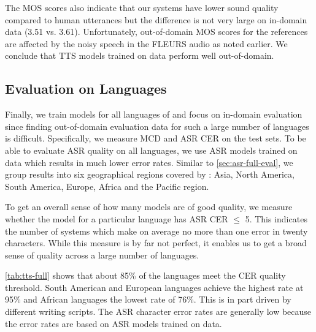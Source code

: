 The MOS scores also indicate that our systems have lower sound quality compared to human utterances but the difference is not very large on in-domain data (3.51 vs. 3.61).
Unfortunately, out-of-domain MOS scores for the references are affected by the noisy speech in the FLEURS audio as noted earlier.
We conclude that TTS models trained on \MMS{} data perform well out-of-domain.


\subsection{Evaluation on \nummmslang{} Languages}
\label{sec:tts-results-all}

Finally, we train models for all languages of \MMS{} and focus on in-domain evaluation since finding out-of-domain evaluation data for such a large number of languages is difficult.
Specifically, we measure MCD and ASR CER on the \MMS{} test sets. 
To be able to evaluate ASR quality on all languages, we use ASR models trained on \MMS{} data which results in much lower error rates.
Similar to \textsection\ref{sec:asr-full-eval}, we group results into six geographical regions covered by \MMS{}: Asia, North America, South America, Europe, Africa and the Pacific region.

To get an overall sense of how many models are of good quality, we measure whether the model for a particular language has ASR CER $\leq$ 5. 
This indicates the number of systems which make on average no more than one error in twenty characters.
While this measure is by far not perfect, it enables us to get a broad sense of quality across a large number of languages.

\insertTableResultsTTSFull

\autoref{tab:tts-full} shows that about 85\% of the \nummmslang{} languages meet the CER quality threshold. 
South American and European languages achieve the highest rate at 95\% and African languages the lowest rate of 76\%. 
This is in part driven by different writing scripts.
The ASR character error rates are generally low because the error rates are based on ASR models trained on \MMS{} data.
